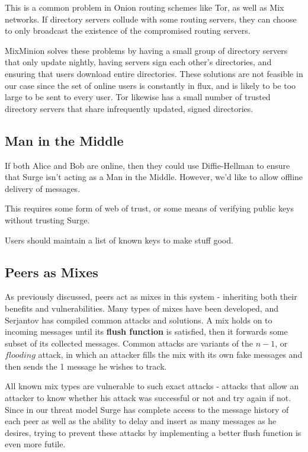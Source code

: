 \documentclass[twocolumn,11pt,english]{paper}
\begin{document}
This is a common problem in Onion routing schemes like Tor, as well as Mix networks. If directory servers collude with some routing servers, they can choose to only broadcast the existence of the compromised routing servers.

MixMinion \cite{minion-design} solves these problems by having a small group of directory servers that only update nightly, having servers sign each other's directories, and ensuring that users download entire directories. These solutions are not feasible in our case since the set of online users is constantly in flux, and is likely to be too large to be sent to every user. Tor \cite{tor-design} likewise has a small number of trusted directory servers that share infrequently updated, signed directories.



\subsection{Man in the Middle} If both Alice and Bob are online, then they could use Diffie-Hellman to ensure that Surge isn't acting as a Man in the Middle. However, we'd like to allow offline delivery of messages.

This requires some form of web of trust, or some means of verifying public keys without trusting Surge. 

Users should maintain a list of known keys to make stuff good. 

\subsection{Peers as Mixes}
As previously discussed, peers act as mixes in this system - inheriting both their benefits and vulnerabilities. Many types of mixes have been developed, and Serjantov \cite{trickle02} has compiled common attacks and solutions. 
A mix holds on to incoming messages until its \textbf{flush function} is satisfied, then it forwards some subset of its collected messages. Common attacks are variants of the $n - 1$, or $flooding$ attack, in which an attacker fills the mix with its own fake messages and then sends the 1 message he wishes to track. 

All known mix types are vulnerable to such exact attacks \cite{trickle02} -  attacks that allow an attacker to know whether his attack was successful or not and try again if not. Since in our threat model Surge has complete access to the message history of each peer as well as the ability to delay and insert as many messages as he desires, trying to prevent these attacks by implementing a better flush function is even more futile. 
\end{document}
